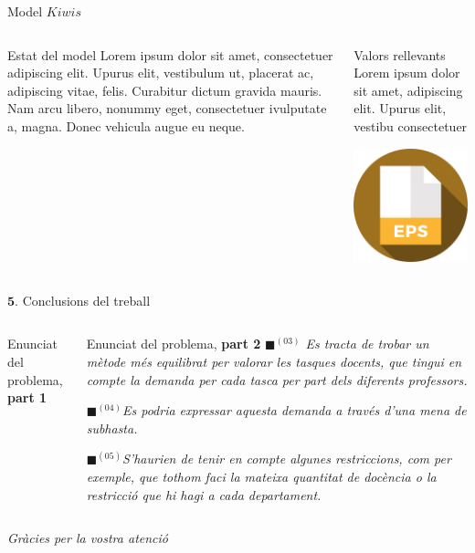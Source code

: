 \documentclass[twocolumn]{beamer}
\begin{document}
\begin{frame}{Model $Kiwis$}
\begin{columns}[t]
	\begin{column}{.5\textwidth}
		\begin{block}{Estat del model}
			Lorem ipsum dolor sit amet,
			consectetuer adipiscing elit. Upurus elit, vestibulum ut,
			placerat ac, adipiscing vitae,
			felis. Curabitur dictum gravida
			mauris. Nam arcu libero,
			nonummy eget, consectetuer ivulputate a, magna. Donec
			vehicula augue eu neque.
		\end{block}
	\end{column}
	\begin{column}{.5\textwidth}
		\begin{block}{Valors rellevants}
			Lorem ipsum dolor sit amet,
			adipiscing elit. Upurus elit, vestibu
			consectetuer 
		\end{block}
		\includegraphics[width=3.5cm]{eps}
	\end{column}
\end{columns}
\end{frame}
\begin{frame}{$\mathbf{5.}$ Conclusions del treball}
\begin{columns}[t]
	\begin{column}{.5\textwidth}
		\begin{block}{Enunciat del problema, \textbf{part 1}}
			
		\end{block}
	\end{column}
	\begin{column}{.5\textwidth}
		\begin{block}{Enunciat del problema, \textbf{part 2}}
			\small	
			\textit{{\color{green!60}$\blacksquare$}$^{(03)}$ {\color{black!80}Es tracta de trobar un mètode més equilibrat per valorar les tasques docents, que tingui en compte la demanda per cada tasca per part dels diferents professors.}}
			
			\textit{{\color{purple!60}$\blacksquare$}$^{(04)}$Es podria expressar aquesta demanda a través d'una mena de subhasta.}
			
			\textit{{\color{violet!60}$\blacksquare$}$^{(05)}${\color{black!80}S'haurien de tenir en compte algunes restriccions, com per exemple, que tothom faci la mateixa quantitat de docència o la restricció que hi hagi a cada departament.}}
		\end{block}
	\end{column}
\end{columns}
\end{frame}
\begin{frame}
\textit{\color{redviolet} \Huge Gràcies per la vostra atenció}
\end{frame}
\end{document}
